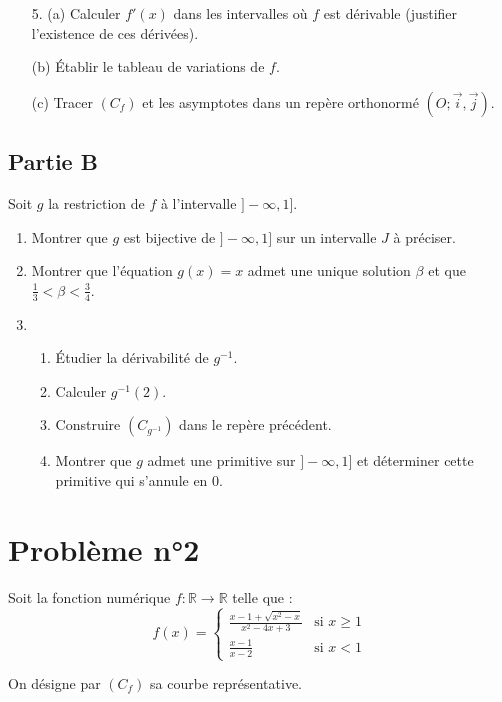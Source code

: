 \documentclass[12pt]{article}
\begin{document}
\begin{enumerate}
    \item[5.] (a) Calculer \( f'(x) \) dans les intervalles où \( f \) est dérivable (justifier l’existence de ces dérivées).
    \item[(b)] Établir le tableau de variations de \( f \).
    \item[(c)] Tracer \( (C_f) \) et les asymptotes dans un repère orthonormé \( (O; \vec{i}, \vec{j}) \).
\end{enumerate}
\subsection*{Partie B}

Soit \( g \) la restriction de \( f \) à l’intervalle \( ] -\infty, 1] \).

\begin{enumerate}
    \item Montrer que \( g \) est bijective de \( ] -\infty, 1] \) sur un intervalle \( J \) à préciser.
    \item Montrer que l’équation \( g(x) = x \) admet une unique solution \( \beta \) et que \( \frac{1}{3} < \beta < \frac{3}{4} \).
    \item 
    \begin{enumerate}
        \item Étudier la dérivabilité de \( g^{-1} \).
        \item Calculer \( g^{-1}(2) \).
        \item Construire \( (C_{g^{-1}}) \) dans le repère précédent.
        \item Montrer que \( g \) admet une primitive sur \( ] -\infty, 1] \) et déterminer cette primitive qui s’annule en 0.
    \end{enumerate}
\end{enumerate}
\section*{Problème n°2}

Soit la fonction numérique \( f : \mathbb{R} \to \mathbb{R} \) telle que :
\[
f(x) = 
\begin{cases} 
\frac{x - 1 + \sqrt{x^2 - x}}{x^2 - 4x + 3} & \text{si } x \geq 1 \\
\frac{x - 1}{x - 2} & \text{si } x < 1 
\end{cases}
\]

On désigne par \( (C_f) \) sa courbe représentative.
\end{document}
